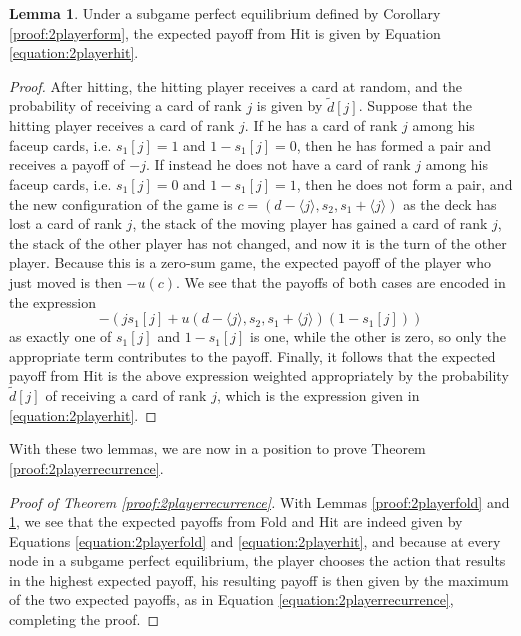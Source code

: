 \documentclass{article}
\theoremstyle{definition}
\newcounter{a}
\newtheorem{lemma}[a]{Lemma}
\begin{document}
\begin{lemma}
Under a subgame perfect equilibrium defined by Corollary \ref{proof:2playerform}, the expected payoff from Hit is given by Equation \ref{equation:2playerhit}.
\begin{proof}
After hitting, the hitting player receives a card at random, and the probability of receiving a card of rank $j$ is given by $\tilde{d}[j]$. Suppose that the hitting player receives a card of rank $j$. If he has a card of rank $j$ among his faceup cards, i.e. $s_1[j]=1$ and $1 - s_1 [j] = 0$, then he has formed a pair and receives a payoff of $-j$. If instead he does not have a card of rank $j$ among his faceup cards, i.e. $s_1[j]=0$ and $1 - s_1 [j] = 1$, then he does not form a pair, and the new configuration of the game is $c = (d - \langle j \rangle, s_2, s_1 + \langle j \rangle)$ as the deck has lost a card of rank $j$, the stack of the moving player has gained a card of rank $j$, the stack of the other player has not changed, and now it is the turn of the other player. Because this is a zero-sum game, the expected payoff of the player who just moved is then $-u(c)$. We see that the payoffs of both cases are encoded in the expression
$$ - \left( j s_1 [j] + u(d - \langle j \rangle, s_2, s_1 + \langle j \rangle) (1 - s_1 [j]) \right)$$
as exactly one of $s_1 [j]$ and $1 - s_1 [j]$ is one, while the other is zero, so only the appropriate term contributes to the payoff. Finally, it follows that the expected payoff from Hit is the above expression weighted appropriately by the probability $\tilde{d}[j]$ of receiving a card of rank $j$, which is the expression given in \ref{equation:2playerhit}.
\end{proof}
\label{proof:2playerhit}
\end{lemma}

With these two lemmas, we are now in a position to prove Theorem \ref{proof:2playerrecurrence}.

\begin{proof}[Proof of Theorem \ref{proof:2playerrecurrence}]
With Lemmas \ref{proof:2playerfold} and \ref{proof:2playerhit}, we see that the expected payoffs from Fold and Hit are indeed given by Equations \ref{equation:2playerfold} and \ref{equation:2playerhit}, and because at every node in a subgame perfect equilibrium, the player chooses the action that results in the highest expected payoff, his resulting payoff is then given by the maximum of the two expected payoffs, as in Equation \ref{equation:2playerrecurrence}, completing the proof.
\end{proof}
\end{document}
